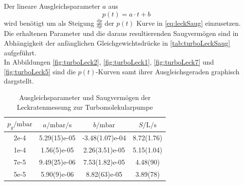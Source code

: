     Der lineare Ausgleichsparameter $a$ aus
    \begin{equation*}
        p(t) = a\cdot t + b
    \end{equation*}
    wird benötigt um als Steigung $\frac{\text{d}p}{\text{d}p}$ der $p(t)$ Kurve in \autoref{eq:leckSaug} einzusetzen.
    Die erhaltenen Parameter und die daraus resultierenden Saugvermögen sind in Abhängigkeit der anfänglichen Gleichgewichtsdrücke in \autoref{tab:turboLeckSaug} aufgeführt.\\
    In Abbildungen \ref{fig:turboLeck2}, \ref{fig:turboLeck1}, \ref{fig:turboLeck7} und \ref{fig:turboLeck5} sind die $p(t)$-Kurven samt ihrer Ausgleichsgeraden graphisch dargstellt.
    \begin{table}
        \centering
        \caption{Ausgleichsparameter und Saugvermögen der Leckratenmessung zur Turbomolekularpumpe}
        \label{tab:turboLeckSaug}
        \begin{tabular}{S[table-format=1e-4]|S[table-format=1.2(2)e-05] S[table-format=3.2(2)e-04] S[table-format=1.2(2)]}
            \toprule
            {$p_g/\unit{\milli\bar}$} & {$a/\unit{\milli\bar\per\second}$} & {$b/\unit{\milli\bar}$} & {$S/\unit{\liter\per\second}$} \\
            \midrule
            2e-4 & 5.29(15)e-05 & -3.48(1.07)e-04 & 8.72(1.76) \\
            1e-4 & 1.56(5)e-05 & 2.26(3.51)e-05 & 5.15(1.04) \\
            7e-5 & 9.49(25)e-06 & 7.53(1.82)e-05 & 4.48(90) \\
            5e-5 & 5.90(9)e-06 & 8.82(63)e-05 & 3.89(78) \\
            \bottomrule
        \end{tabular}
    \end{table}


